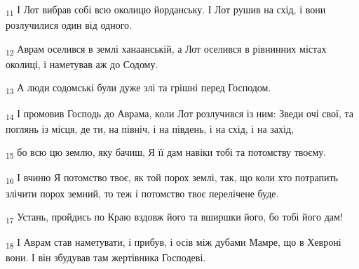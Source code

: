 \begin{tcolorbox}
\textsubscript{11} І Лот вибрав собі всю околицю йорданську. І Лот рушив на схід, і вони розлучилися один від одного.
\end{tcolorbox}
\begin{tcolorbox}
\textsubscript{12} Аврам оселився в землі ханаанській, а Лот оселився в рівнинних містах околиці, і наметував аж до Содому.
\end{tcolorbox}
\begin{tcolorbox}
\textsubscript{13} А люди содомські були дуже злі та грішні перед Господом.
\end{tcolorbox}
\begin{tcolorbox}
\textsubscript{14} І промовив Господь до Аврама, коли Лот розлучився із ним: Зведи очі свої, та поглянь із місця, де ти, на північ, і на південь, і на схід, і на захід,
\end{tcolorbox}
\begin{tcolorbox}
\textsubscript{15} бо всю цю землю, яку бачиш, Я її дам навіки тобі та потомству твоєму.
\end{tcolorbox}
\begin{tcolorbox}
\textsubscript{16} І вчиню Я потомство твоє, як той порох землі, так, що коли хто потрапить злічити порох земний, то теж і потомство твоє перелічене буде.
\end{tcolorbox}
\begin{tcolorbox}
\textsubscript{17} Устань, пройдись по Краю вздовж його та вширшки його, бо тобі його дам!
\end{tcolorbox}
\begin{tcolorbox}
\textsubscript{18} І Аврам став наметувати, і прибув, і осів між дубами Мамре, що в Хевроні вони. І він збудував там жертівника Господеві.
\end{tcolorbox}
